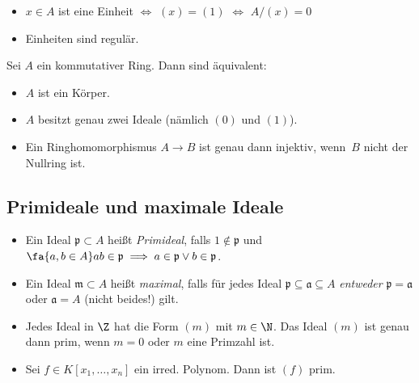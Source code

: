 \documentclass{cheat-sheet}
\newcommand{\aaa}{\mathfrak{a}}
\newcommand{\ppp}{\mathfrak{p}}
\newcommand{\mmm}{\mathfrak{m}}
\begin{document}
\begin{beob}
  \begin{itemize}
    \item $x \in A$ ist eine Einheit $\iff$ $(x) = (1)$ $\iff$ $A/(x) = 0$
    \item Einheiten sind regulär.
  \end{itemize}
\end{beob}


\begin{samepage}

\begin{prop}
  Sei $A$ ein kommutativer Ring.
  Dann sind äquivalent:
  \begin{itemize}
    \item $A$ ist ein Körper.
    \item $A$ besitzt genau zwei Ideale (nämlich $(0)$ und $(1)$).
    \item Ein Ringhomomorphismus $A \to B$ ist genau dann injektiv, wenn~$B$ nicht der Nullring ist.
  \end{itemize}
\end{prop}

\subsection{Primideale und maximale Ideale}

\end{samepage}

\begin{defn}
  \begin{itemize}
    \item Ein Ideal $\ppp \subset A$ heißt \emph{Primideal}, falls $1 \not\in \ppp$ und $\fa{a, b \in A} ab \in \ppp \implies a \in \ppp \vee b \in \ppp$.
    \item Ein Ideal $\mmm \subset A$ heißt \emph{maximal}, falls für jedes Ideal $\ppp \subseteq \aaa \subseteq A$ \textit{entweder} $\ppp = \aaa$ oder $\aaa = A$ (nicht beides!) gilt.
  \end{itemize}
\end{defn}

\begin{bspe}
  \begin{itemize}
    \item Jedes Ideal in $\Z$ hat die Form $(m)$ mit $m \in \N$.
    Das Ideal $(m)$ ist genau dann prim, wenn $m=0$ oder $m$ eine Primzahl ist.
    \item Sei $f \in K[x_1, \ldots, x_n]$ ein irred. Polynom.
    Dann ist $(f)$ prim.
\end{itemize}
\end{bspe}
\end{document}
